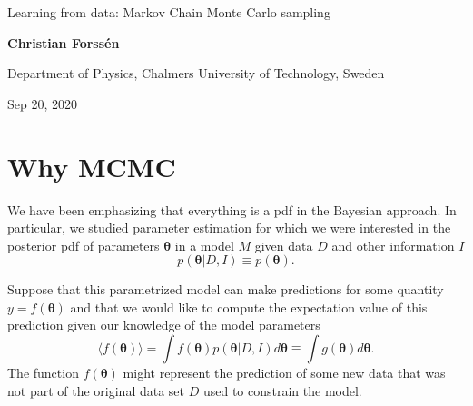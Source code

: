 \documentclass[%
oneside,                 %
final,                   %
10pt]{article}
\begin{document}

\newcommand{\exercisesection}[1]{\subsection*{#1}}







\thispagestyle{empty}

\begin{center}
{\LARGE\bf
\begin{spacing}{1.25}
Learning from data: Markov Chain Monte Carlo sampling 
\end{spacing}
}
\end{center}


\begin{center}
{\bf Christian Forssén}
\end{center}

    \begin{center}
\centerline{{\small Department of Physics, Chalmers University of Technology, Sweden}}
\end{center}
    

\begin{center}
Sep 20, 2020
\end{center}

\vspace{1cm}


\section{Why MCMC}
We have been emphasizing that everything is a pdf in the Bayesian approach. In particular, we studied parameter estimation for which we were interested in the posterior pdf of parameters $\boldsymbol{\theta}$ in a model $M$ given data $D$ and other information $I$
\[
p(\boldsymbol{\theta} | D, I) \equiv p(\boldsymbol{\theta}).
\]

Suppose that this parametrized model can make predictions for some quantity $y = f(\boldsymbol{\theta})$ and that we would like to compute the expectation value of this prediction given our knowledge of the model parameters
\[
\langle f(\boldsymbol{\theta}) \rangle = \int f(\boldsymbol{\theta}) p(\boldsymbol{\theta} | D,I) d \boldsymbol{\theta} \equiv \int g( \boldsymbol{\theta} ) d\boldsymbol{\theta}.
\]
The function $f(\boldsymbol{\theta})$ might represent the prediction of some new data that was not part of the original data set $D$ used to constrain the model.
\end{document}

